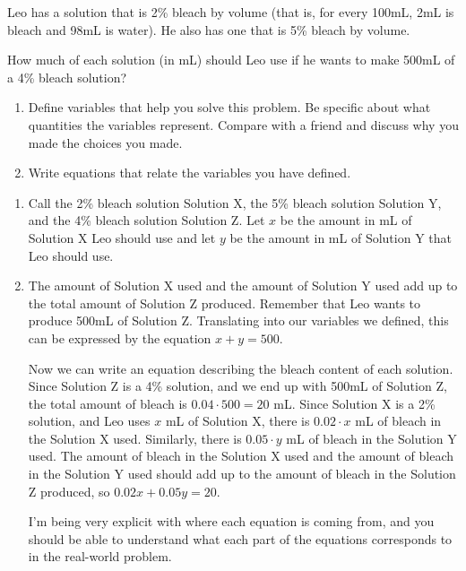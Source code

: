 \documentclass[noauthor]{ximera}
\begin{document}
\begin{problem}
Leo has a solution that is 2\% bleach by volume (that is, for every 100mL, 2mL is bleach and 98mL is water). He also has one that is 5\% bleach by volume. 

How much of each solution (in mL) should Leo use if he wants to make 500mL of a 4\% bleach solution?

\begin{enumerate}
    \item Define variables that help you solve this 
    problem. Be specific about what quantities the variables
    represent. Compare with a friend and discuss why you made 
    the choices you made.
    \item Write equations that relate the variables you 
    have defined.
\end{enumerate}

\begin{explanation}
\begin{enumerate}
    \item Call the 2\% bleach solution Solution X, the 5\% bleach solution Solution Y, and the 4\% bleach solution Solution Z. Let \(x\) be the amount in mL of Solution X Leo should use and let \(y\) be the amount in mL of Solution Y
    that Leo should use. 
    \item The amount of Solution X used and the amount of Solution Y used add up to the total
    amount of Solution Z produced. Remember that Leo wants to produce 500mL of Solution Z.
    Translating into our variables we defined, this can
    be expressed by the equation \(x + y = 500\).

    Now we can write an equation describing the bleach content of each solution. 
    Since Solution Z is a 4\% solution, and we end up with 500mL of Solution Z,
    the total amount of bleach is \(0.04 \cdot 500 = 20\) mL. Since Solution X is a 2\% solution,
    and Leo uses \(x\) mL of Solution X, there is \(0.02\cdot x\) mL of bleach in the Solution X used. Similarly, there is
    \(0.05 \cdot y\) mL of bleach in the Solution Y used. The amount of bleach in the Solution X used and the amount of bleach in the
    Solution Y used should add up to the amount of bleach in the Solution Z
    produced, so \(0.02x + 0.05y = 20\).

    I'm being very explicit with where each equation is coming from, and you should be able to understand what each part of the equations 
    corresponds to in the real-world problem.
\end{enumerate}

\end{explanation}
\end{problem}
\end{document}
